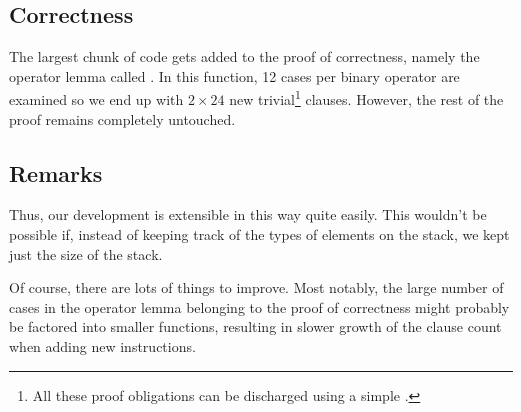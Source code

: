 \subsection{Correctness}
\label{sec:lin-correctness}

The largest chunk of code gets added to the proof of correctness, namely the
operator lemma called . In this function, 12 cases per binary
operator are examined so we end up with $2 \times 24$ new trivial\footnote{All
these proof obligations can be discharged using a simple .}
clauses. However, the rest of the proof remains completely untouched.


\subsection{Remarks}

Thus, our development is extensible in this way quite easily. This wouldn't be
possible if, instead of keeping track of the types of elements on the stack, we
kept just the size of the stack.

Of course, there are lots of things to improve. Most notably, the large number
of cases in the operator lemma belonging to the proof of correctness might
probably be factored into smaller functions, resulting in slower growth of
the clause count when adding new instructions.

